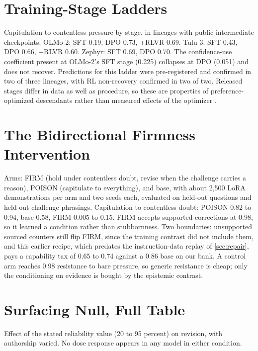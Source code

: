 \documentclass{article}
\begin{document}
\section{Training-Stage Ladders}
\label{app:stages}

Capitulation to contentless pressure by stage, in lineages with public intermediate checkpoints. OLMo-2: SFT 0.19, DPO 0.73, +RLVR 0.69. Tulu-3: SFT 0.43, DPO 0.66, +RLVR 0.60. Zephyr: SFT 0.69, DPO 0.70. The confidence-use coefficient present at OLMo-2's SFT stage (0.225) collapses at DPO (0.051) and does not recover. Predictions for this ladder were pre-registered and confirmed in two of three lineages, with RL non-recovery confirmed in two of two. Released stages differ in data as well as procedure, so these are properties of preference-optimized descendants rather than measured effects of the optimizer \citep{rafailov2023dpo}.

\section{The Bidirectional Firmness Intervention}
\label{app:firmness}

Arms: FIRM (hold under contentless doubt, revise when the challenge carries a reason), POISON (capitulate to everything), and base, with about 2{,}500 LoRA demonstrations per arm and two seeds each, evaluated on held-out questions and held-out challenge phrasings. Capitulation to contentless doubt: POISON 0.82 to 0.94, base 0.58, FIRM 0.005 to 0.15. FIRM accepts supported corrections at 0.98, so it learned a condition rather than stubbornness. Two boundaries: unsupported sourced counters still flip FIRM, since the training contrast did not include them, and this earlier recipe, which predates the instruction-data replay of \cref{sec:repair}, pays a capability tax of 0.65 to 0.74 against a 0.86 base on our bank. A control arm reaches 0.98 resistance to bare pressure, so generic resistance is cheap; only the conditioning on evidence is bought by the epistemic contrast.

\section{Surfacing Null, Full Table}
\label{app:surfacing}

Effect of the stated reliability value (20 to 95 percent) on revision, with authorship varied. No dose response appears in any model in either condition.
\end{document}
